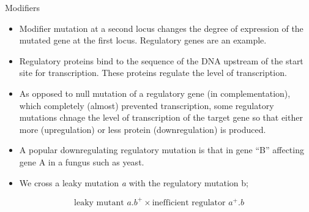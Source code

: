 \documentclass[11pt,dvipsnames,ignorenonframetext,aspectratio=169]{beamer}
\providecommand{\tightlist}{%
  \setlength{\itemsep}{0pt}\setlength{\parskip}{0pt}}
\begin{document}
\begin{frame}{Modifiers}
\protect\hypertarget{modifiers}{}

\begin{itemize}
\tightlist
\item
  Modifier mutation at a second locus changes the degree of expression
  of the mutated gene at the first locus. Regulatory genes are an
  example.
\item
  Regulatory proteins bind to the sequence of the DNA upstream of the
  start site for transcription. These proteins regulate the level of
  transcription.
\item
  As opposed to null mutation of a regulatory gene (in complementation),
  which completely (almost) prevented transcription, some regulatory
  mutations chnage the level of transcription of the target gene so that
  either more (upregulation) or less protein (downregulation) is
  produced.
\item
  A popular downregulating regulatory mutation is that in gene ``B''
  affecting gene A in a fungus such as yeast.
\item
  We cross a leaky mutation \emph{a} with the regulatory mutation b;
\end{itemize}

\[
\textrm{leaky mutant } a.b^+ \times \textrm{inefficient regulator } a^+.b
\]

\end{frame}
\end{document}
